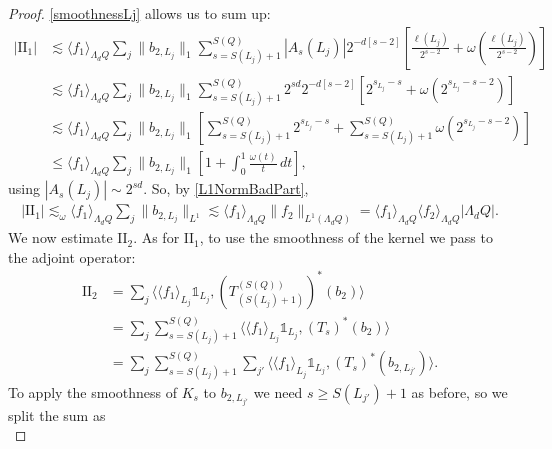 \documentclass[12pt]{amsart}
\newcommand{\one}{\mathds{1}}
\theoremstyle{plain}
\theoremstyle{definition} %
\numberwithin{equation}{section}
\begin{document}
\begin{proof}
\eqref{smoothnessLj} allows us to sum up:
        \begin{align*}
        |\mathrm{II}_1|
        &\lesssim
        \langle f_1\rangle_{\Lambda_dQ}\sum_j\|b_{2,L_j}\|_{1}\sum_{s=S(L_j)+1}^{S(Q)}|A_s(L_j)| 2^{-d[s-2]}
    \left[\frac{\ell(L_j)}{2^{s-2}}+\omega\left(\frac{\ell(L_j)}{2^{s-2}}\right)\right] \\
    & \lesssim \langle f_1\rangle_{\Lambda_dQ}\sum_j\|b_{2,L_j}\|_{1}\sum_{s=S(L_j)+1}^{S(Q)}2^{sd} 2^{-d[s-2]}
    \left[2^{s_{L_j}-s}+\omega\left(2^{s_{L_j}-s-2}\right)\right] \\
    & \lesssim 
        \langle f_1\rangle_{\Lambda_dQ}\sum_j\|b_{2,L_j}\|_{1}\left[\sum_{s=S(L_j)+1}^{S(Q)}
        2^{s_{L_j}-s}
        +
        \sum_{s=S(L_j)+1}^{S(Q)}\omega\left(2^{s_{L_j}-s-2}\right)
        \right]
        \\&\leq 
        \langle f_1\rangle_{\Lambda_dQ}\sum_j\|b_{2,L_j}\|_{1}\left[1+\int_{0}^{1}\frac{\omega(t)}{t}\, dt\right], 
        \end{align*}
using $|A_s(L_j)| \sim 2^{sd}$. So, by \eqref{L1NormBadPart},
        \begin{align*}
        |\mathrm{II}_1|    
        \lesssim_{\omega}
        \langle f_1\rangle_{\Lambda_dQ}\sum_j\|b_{2,L_j}\|_{L^1}
        \lesssim
        \langle f_1\rangle_{\Lambda_dQ}\|f_2\|_{L^1(\Lambda_dQ)}
        =
        \langle f_1\rangle_{\Lambda_dQ}\langle f_2\rangle_{\Lambda_dQ}|\Lambda_dQ|.
    \end{align*}
We now estimate $\mathrm{II}_2$. As for $\mathrm{II}_1$, to use the smoothness of the kernel we pass to the adjoint operator:
\begin{align*}
\mathrm{II}_2 & = \sum_{j}\langle \langle f_1\rangle_{L_j}\one_{L_j},\left(T_{(S(L_j)+1)}^{(S(Q))}\right)^{\ast}(b_2)\rangle \\
& = \sum_j\sum_{s=S(L_j)+1}^{S(Q)}\langle \langle f_1\rangle_{L_j}\one_{L_j},(T_s)^{\ast}(b_2)\rangle \\
& = \sum_{j}\sum_{s=S(L_j)+1}^{S(Q)}\sum_{j'}
\langle \langle f_1\rangle_{L_j}\one_{L_j},(T_s)^{\ast}(b_{2,L_{j'}})\rangle.
\end{align*}
To apply the smoothness of $K_s$ to $b_{2,L_{j'}}$ we need $s\geq S(L_{j'})+1$ as before, so we split the sum as
\begin{equation}\label{II_2LoQueHayQueEstimar}

\end{equation}
\end{proof}
\end{document}
